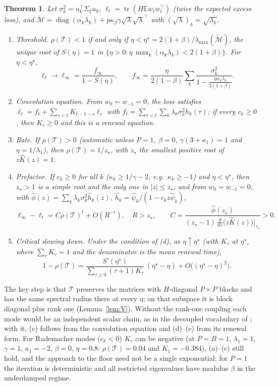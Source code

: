 \documentclass[11pt]{article}
\newtheorem{theorem}{Theorem}
\newcommand{\E}{\mathbb{E}}
\newcommand{\tr}{\operatorname{tr}}
\newcommand{\T}{\mathcal T}
\begin{document}
\begin{theorem}\label{thm:main}
Let $\sigma_k^2=u_k^\top\Sigma_\xi u_k$, $\ell_t=\tr(H\E w_tw_t^\top)$ (twice the expected excess loss), and $\widetilde{\mathcal M}=\operatorname{diag}(\alpha_k\lambda_k)+p\kappa_\beta\gamma\sqrt\lambda\sqrt\lambda^\top$ with $(\sqrt\lambda)_k=\sqrt{\lambda_k}$.
\begin{enumerate}
\item[(a)] \emph{Threshold.} $\rho(\T)<1$ if and only if $\eta<\eta^\star=2(1+\beta)/\lambda_{\max}(\widetilde{\mathcal M})$, the unique root of $S(\eta)=1$ in $\{\eta>0:\eta\,\max_k(\alpha_k\lambda_k)<2(1+\beta)\}$. For $\eta<\eta^\star$,
\[
\ell_t\to\ell_\infty=\frac{f_\infty}{1-S(\eta)},\qquad f_\infty=\frac{\eta}{2(1-\beta)}\sum_k\frac{\sigma_k^2}{1-\frac{\eta\alpha_k\lambda_k}{2(1+\beta)}} .
\]
\item[(b)] \emph{Convolution equation.} From $w_0=w_{-1}=0$, the loss satisfies $\ell_t=f_t+\sum_{s<t}K_{t-1-s}\ell_s$ with $f_t=\sum_{\tau<t}\sum_k\lambda_k\sigma_k^2h_k(\tau)$; if every $c_k\ge0$, then $K_\tau\ge0$ and this is a renewal equation.
\item[(c)] \emph{Rate.} If $\rho(\T)>0$ (automatic unless $P=1$, $\beta=0$, $\gamma(3+\kappa_1)=1$ and $\eta=1/\lambda_1$), then $\rho(\T)=1/z_\star$, with $z_\star$ the smallest positive root of $z\widehat K(z)=1$.
\item[(d)] \emph{Prefactor.} If $c_k\ge0$ for all $k$ ($\kappa_k\ge1/\gamma-2$, e.g.\ $\kappa_k\ge-1$) and $\eta<\eta^\star$, then $z_\star>1$ is a simple root and the only one in $|z|\le z_\star$, and from $w_0=w_{-1}=0$, with $\widehat\phi(z)=\sum_k\lambda_k\sigma_k^2\widehat h_k(z)$, $\widehat h_k=\widehat\psi_k/(1-c_kz\widehat\psi_k)$,
\[
\ell_\infty-\ell_t=C\rho(\T)^t+O(R^{-t}),\quad R>z_\star,\qquad C=\frac{\widehat\phi(z_\star)}{(z_\star-1)\,\frac{d}{dz}\big(z\widehat K(z)\big)\big|_{z_\star}}>0 .
\]
\item[(e)] \emph{Critical slowing down.} Under the condition of (d), as $\eta\uparrow\eta^\star$ (with $K_\tau$ at $\eta^\star$, where $\sum_\tau K_\tau=1$ and the denominator is the mean renewal time),
\[
1-\rho(\T)=\frac{S'(\eta^\star)}{\sum_{\tau\ge0}(\tau+1)K_\tau}\,(\eta^\star-\eta)+O\big((\eta^\star-\eta)^2\big).
\]
\end{enumerate}
\end{theorem}

The key step is that $\T$ preserves the matrices with $H$-diagonal $P\times P$ blocks and has the same spectral radius there at every $\eta$; on that subspace it is block diagonal plus rank one (Lemma~\ref{lem:V}). Without the rank-one coupling each mode would be an independent scalar chain, as in the decoupled vocabulary of \citet[Lemma~H.12]{everett2026sparse}; with it, (c) follows from the convolution equation and (d)--(e) from its renewal form. For Rademacher modes ($c_k<0$) $K_\tau$ can be negative (at $P=B=1$, $\lambda_1=1$, $\gamma=1$, $\kappa_1=-2$, $\beta=0$, $\eta=0.8$: $\rho(\T)=0.04$ and $K_1=-0.384$), (a)--(c) still hold, and the approach to the floor need not be a single exponential: for $P=1$ the iteration is deterministic and all restricted eigenvalues have modulus $\beta$ in the underdamped regime.
\end{document}
